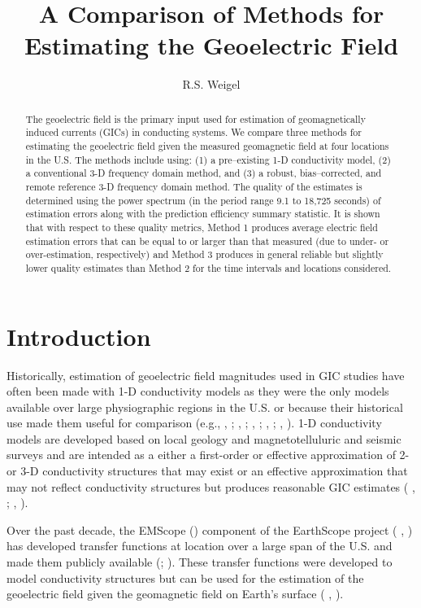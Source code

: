 \documentclass[12pt]{article}
\newcommand{\citeay}[1]{%
\citeauthor{#1}, \citeyear{#1}%
}
\begin{document}
\title{A Comparison of Methods for Estimating the Geoelectric Field}
\author{R.S. Weigel}
\doublespacing
\maketitle

\begin{abstract}
The geoelectric field is the primary input used for estimation of geomagnetically induced currents (GICs) in conducting systems.  We compare three methods for estimating the geoelectric field given the measured geomagnetic field at four locations in the U.S. The methods include using: (1) a pre--existing 1-D conductivity model, (2) a conventional 3-D frequency domain method, and (3) a robust, bias--corrected, and remote reference 3-D frequency domain method.  The quality of the estimates is determined using the power spectrum (in the period range 9.1 to 18,725 seconds) of estimation errors along with the prediction efficiency summary statistic. It is shown that with respect to these quality metrics, Method 1 produces average electric field estimation errors that can be equal to or larger than that measured (due to under- or over-estimation, respectively) and Method 3 produces in general reliable but slightly lower quality estimates than Method 2 for the time intervals and locations considered. 
\end{abstract}

\section{Introduction}

Historically, estimation of geoelectric field magnitudes used in GIC studies have often been made with 1-D conductivity models as they were the only models available over large physiographic regions in the U.S. or because their historical use made them useful for comparison (e.g., \citeay{Pulkkinen2012}; \citeay{Wei2013}; \citeay{Viljanen2014}; \citeay{Boteler2015}; \citeay{NERC2015}).  1-D conductivity models are developed based on local geology and magnetotelluluric and seismic surveys and are intended as a either a first-order or effective approximation of 2- or 3-D conductivity structures that may exist or an effective approximation that may not reflect conductivity structures but produces reasonable GIC estimates (\citeay{Fernberg2012}; \citeay{Boteler2015}). 

Over the past decade, the EMScope (\cite{Schultz2009}) component of the EarthScope project (\citeay{Meltzer2003}) has developed transfer functions at location over a large span of the U.S. and made them publicly available (\cite{Kelbert2011}; \cite{Schultz2016}).  These transfer functions were developed to model conductivity structures but can be used for the estimation of the geoelectric field given the geomagnetic field on Earth's surface (\citeay{Bedrosian2015}).
\end{document}
